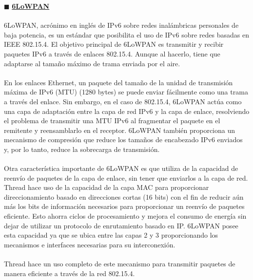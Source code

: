 $\blacksquare$ {\underline{\textbf{6LoWPAN}}} %
\\\\6LoWPAN, acrónimo en inglés de IPv6 sobre redes inalámbricas personales de baja potencia, es un estándar que posibilita el uso de IPv6 sobre redes basadas en IEEE 802.15.4. El objetivo principal de 6LoWPAN es transmitir y recibir paquetes IPv6 a través de enlaces 802.15.4. Aunque al hacerlo, tiene que adaptarse al tamaño máximo de trama enviada por el aire.
\\\\En los enlaces Ethernet, un paquete del tamaño de la unidad de transmisión máxima de IPv6 (MTU) (1280 bytes) se puede enviar fácilmente como una trama a través del enlace. Sin embargo, en el caso de 802.15.4, 6LoWPAN actúa como una capa de adaptación entre la capa de red IPv6 y la capa de enlace, resolviendo el problema de transmitir una MTU IPv6 al fragmentar el paquete en el remitente y reensamblarlo en el receptor. 6LoWPAN también proporciona un mecanismo de compresión que reduce los tamaños de encabezado IPv6 enviados y, por lo tanto, reduce la sobrecarga de transmisión.
\\\\
Otra característica importante de 6LoWPAN es que utiliza de la capacidad de reenvío de paquetes de la capa de enlace, sin tener que enviarlos a la capa de red. Thread hace uso de la capacidad de la capa MAC para proporcionar direccionamiento basado en direcciones cortas (16 bits) con el fin de reducir aún más los bits de información necesarios para proporcionar un reenvío de paquetes eficiente. Esto ahorra ciclos de procesamiento y mejora el consumo de energía sin dejar de utilizar un protocolo de enrutamiento basado en IP. 6LoWPAN posee esta capacidad ya que se ubica entre las capas 2 y 3 proporcionando los mecanismos e interfaces necesarias para su interconexión.
\\\\Thread hace un uso completo de este mecanismo para transmitir paquetes de manera eficiente a través de la red 802.15.4.

